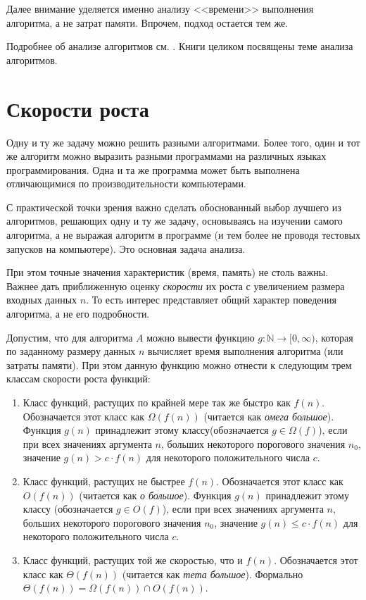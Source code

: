 Далее внимание уделяется именно анализу <<времени>> выполнения алгоритма, а не затрат памяти. Впрочем, подход остается тем же. 

Подробнее об анализе алгоритмов см. \cite{bib:haggard:discrmathprogrammer}. Книги \cite{bib:miller:secParAlghorithm, bib:mcconnel:alghorithmAnalysis} целиком посвящены теме анализа алгоритмов.


\section{Скорости роста}

Одну и ту же задачу можно решить разными алгоритмами. Более того, один и тот же алгоритм можно выразить разными программами на различных языках программирования. Одна и та же программа может быть выполнена отличающимися по производительности компьютерами.

С практической точки зрения важно сделать обоснованный выбор лучшего из алгоритмов, решающих одну и ту же задачу, основываясь на изучении самого алгоритма, а не выражая алгоритм в программе (и тем более не проводя тестовых запусков на компьютере). Это основная задача анализа. 

При этом точные значения характеристик (время, память) не столь важны. Важнее дать приближенную оценку \emph{скорости} их роста с увеличением размера входных данных $n$. То есть интерес представляет общий характер поведения алгоритма, а не его подробности.

Допустим, что для алгоритма $A$ можно вывести функцию $g:\mathbb{N}\to[0,\infty)$, которая по заданному размеру данных $n$ вычисляет время выполнения алгоритма (или затраты памяти). При этом данную функцию можно отнести к следующим трем классам скорости роста функций:
\begin{enumerate}
    \item Класс функций, растущих по крайней мере так же быстро как $f(n)$. Обозначается этот класс как $\Omega(f(n))$ (читается как \emph{омега большое}). Функция $g(n)$ принадлежит этому классу(обозначается $g\in\Omega(f)$), если при всех значениях аргумента $n$, больших некоторого порогового значения $n_0$, значение $g(n)>c\cdot f(n)$ для некоторого положительного числа $c$.
    
    \item Класс функций, растущих не быстрее $f(n)$. Обозначается этот класс как $O(f(n))$ (читается как \emph{о большое}). Функция $g(n)$ принадлежит этому классу (обозначается $g\in O(f)$), если при всех значениях аргумента $n$, больших некоторого порогового значения $n_0$, значение $g(n)\leq c\cdot f(n)$ для некоторого положительного числа $c$.
    
    \item Класс функций, растущих той же скоростью, что и $f(n)$. Обозначается этот класс как $\Theta(f(n))$ (читается как \emph{тета большое}). Формально $\Theta(f(n))=\Omega(f(n))\cap O(f(n))$.
\end{enumerate}


